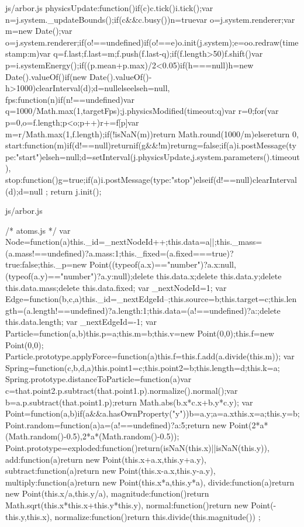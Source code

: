 \documentclass{article}
\begin{document}
\begin{chunk}{js/arbor.js}
{{        physicsUpdate:function(){if(c){c.tick()}i.tick();var n=j.system._updateBounds();if(c&&c.busy()){n=true}var o=j.system.renderer;var m=new Date();var o=j.system.renderer;if(o!==undefined){if(o!==e){o.init(j.system);e=o}o.redraw({timestamp:m})}var q=f.last;f.last=m;f.push(f.last-q);if(f.length>50){f.shift()}var p=i.systemEnergy();if((p.mean+p.max)/2<0.05){if(h===null){h=new Date().valueOf()}if(new Date().valueOf()-h>1000){clearInterval(d);d=null}else{}}else{h=null}},
        fps:function(n){if(n!==undefined){var q=1000/Math.max(1,targetFps);j.physicsModified({timeout:q})}var r=0;for(var p=0,o=f.length;p<o;p++){r+=f[p]}var m=r/Math.max(1,f.length);if(!isNaN(m)){return Math.round(1000/m)}else{return 0}},
        start:function(m){if(d!==null){return}if(g&&!m){return}g=false;if(a){i.postMessage({type:"start"})}else{h=null;d=setInterval(j.physicsUpdate,j.system.parameters().timeout)}},
        stop:function(){g=true;if(a){i.postMessage({type:"stop"})}else{if(d!==null){clearInterval(d);d=null}}}
};
  return j.init()};

\end{chunk}
\begin{chunk}{js/arbor.js}

  /*      atoms.js */  
 var Node=function(a){this._id=_nextNodeId++;this.data=a||{};this._mass=(a.mass!==undefined)?a.mass:1;this._fixed=(a.fixed===true)?true:false;this._p=new Point((typeof(a.x)=="number")?a.x:null,(typeof(a.y)=="number")?a.y:null);delete this.data.x;delete this.data.y;delete this.data.mass;delete this.data.fixed};
 var _nextNodeId=1;
 var Edge=function(b,c,a){this._id=_nextEdgeId--;this.source=b;this.target=c;this.length=(a.length!==undefined)?a.length:1;this.data=(a!==undefined)?a:{};delete this.data.length};
 var _nextEdgeId=-1;
 var Particle=function(a,b){this.p=a;this.m=b;this.v=new Point(0,0);this.f=new Point(0,0)};
 Particle.prototype.applyForce=function(a){this.f=this.f.add(a.divide(this.m))};
 var Spring=function(c,b,d,a){this.point1=c;this.point2=b;this.length=d;this.k=a};
 Spring.prototype.distanceToParticle=function(a){var c=that.point2.p.subtract(that.point1.p).normalize().normal();var b=a.p.subtract(that.point1.p);return Math.abs(b.x*c.x+b.y*c.y)};
 var Point=function(a,b){if(a&&a.hasOwnProperty("y")){b=a.y;a=a.x}this.x=a;this.y=b};
 Point.random=function(a){a=(a!==undefined)?a:5;return new Point(2*a*(Math.random()-0.5),2*a*(Math.random()-0.5))};
 Point.prototype={exploded:function(){return(isNaN(this.x)||isNaN(this.y))},
 add:function(a){return new Point(this.x+a.x,this.y+a.y)},
 subtract:function(a){return new Point(this.x-a.x,this.y-a.y)},
 multiply:function(a){return new Point(this.x*a,this.y*a)},
 divide:function(a){return new Point(this.x/a,this.y/a)},
 magnitude:function(){return Math.sqrt(this.x*this.x+this.y*this.y)},
 normal:function(){return new Point(-this.y,this.x)},
 normalize:function(){return this.divide(this.magnitude())}
};

\end{chunk}
\end{document}

